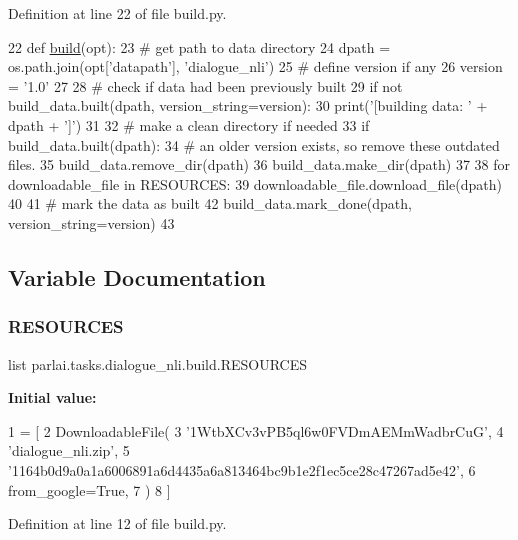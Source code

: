 Definition at line 22 of file build.\+py.


\begin{DoxyCode}
22 \textcolor{keyword}{def }\hyperlink{namespacedialog__babi__feedback_1_1build_a7a9d289f7493a5ded13c4b7f071b6184}{build}(opt):
23     \textcolor{comment}{# get path to data directory}
24     dpath = os.path.join(opt[\textcolor{stringliteral}{'datapath'}], \textcolor{stringliteral}{'dialogue\_nli'})
25     \textcolor{comment}{# define version if any}
26     version = \textcolor{stringliteral}{'1.0'}
27 
28     \textcolor{comment}{# check if data had been previously built}
29     \textcolor{keywordflow}{if} \textcolor{keywordflow}{not} build\_data.built(dpath, version\_string=version):
30         print(\textcolor{stringliteral}{'[building data: '} + dpath + \textcolor{stringliteral}{']'})
31 
32         \textcolor{comment}{# make a clean directory if needed}
33         \textcolor{keywordflow}{if} build\_data.built(dpath):
34             \textcolor{comment}{# an older version exists, so remove these outdated files.}
35             build\_data.remove\_dir(dpath)
36         build\_data.make\_dir(dpath)
37 
38         \textcolor{keywordflow}{for} downloadable\_file \textcolor{keywordflow}{in} RESOURCES:
39             downloadable\_file.download\_file(dpath)
40 
41         \textcolor{comment}{# mark the data as built}
42         build\_data.mark\_done(dpath, version\_string=version)
43 \end{DoxyCode}


\subsection{Variable Documentation}
\mbox{\label{namespaceparlai_1_1tasks_1_1dialogue__nli_1_1build_a2d6a9ea10c5e9897f090f380fde28e40}} 
\subsubsection{\texorpdfstring{R\+E\+S\+O\+U\+R\+C\+ES}{RESOURCES}}
{\footnotesize\ttfamily list parlai.\+tasks.\+dialogue\+\_\+nli.\+build.\+R\+E\+S\+O\+U\+R\+C\+ES}

{\bfseries Initial value\+:}
\begin{DoxyCode}
1 =  [
2     DownloadableFile(
3         \textcolor{stringliteral}{'1WtbXCv3vPB5ql6w0FVDmAEMmWadbrCuG'},
4         \textcolor{stringliteral}{'dialogue\_nli.zip'},
5         \textcolor{stringliteral}{'1164b0d9a0a1a6006891a6d4435a6a813464bc9b1e2f1ec5ce28c47267ad5e42'},
6         from\_google=\textcolor{keyword}{True},
7     )
8 ]
\end{DoxyCode}


Definition at line 12 of file build.\+py.

